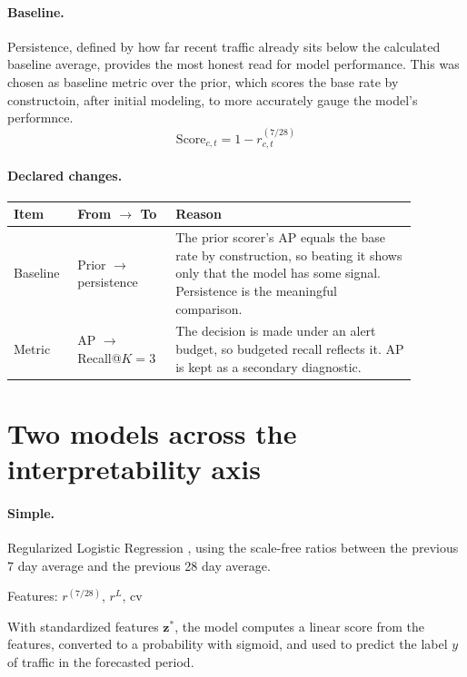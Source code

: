 \documentclass[11pt]{article}
\begin{document}
\paragraph{Baseline.}

Persistence, defined by how far recent traffic already sits below the calculated baseline average, provides the most honest read for model performance. This was chosen as baseline metric over the prior, which scores the base rate by constructoin, after initial modeling, to more accurately gauge the model's performnce. 
$$
\mathrm{Score}_{c, t} = 1 - r^{(7/28)}_{c, t}
$$


\paragraph{Declared changes.}
\begin{center}
\small
\begin{tabular}{p{0.12\linewidth}p{0.22\linewidth}p{0.54\linewidth}}
\toprule
Item & From $\to$ To & Reason \\
\midrule
Baseline & Prior $\to$ persistence & The prior scorer's AP equals the base rate by construction, so beating it shows only that the model has some signal. Persistence is the meaningful comparison. \\
Metric & AP $\to$ Recall@$K=3$ & The decision is made under an alert budget, so budgeted recall reflects it. AP is kept as a secondary diagnostic. \\

\bottomrule
\end{tabular}
\end{center}
\section{Two models across the interpretability axis}  %
\paragraph{Simple.}

Regularized Logistic Regression \cite{sklearn}, using the scale-free ratios between the previous 7 day average and the previous 28 day average.

Features: $r^{(7/28)},\,r^{L},\,\mathrm{cv}$

With standardized features $\mathbf{z}^*$, the model computes a linear score from the features, converted to a probability with sigmoid, and used to predict the label $y$ of traffic in the forecasted period. 
\end{document}
